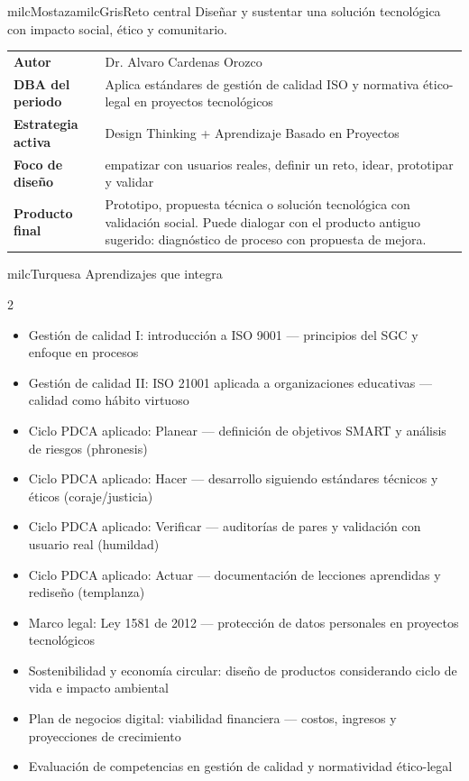 \documentclass[11pt,letterpaper]{article}
\begin{document}
\begin{softbox}{milcMostaza}{milcGris}{Reto central}
Diseñar y sustentar una solución tecnológica con impacto social, ético y comunitario.
\end{softbox}

\begin{tabularx}{\textwidth}{>{\bfseries}p{3.4cm}X}
\rowcolor{milcMagenta!12}Autor & Dr. Alvaro Cardenas Orozco\\
DBA del periodo & Aplica estándares de gestión de calidad ISO y normativa ético-legal en proyectos tecnológicos\\
Estrategia activa & Design Thinking + Aprendizaje Basado en Proyectos\\
Foco de diseño & empatizar con usuarios reales, definir un reto, idear, prototipar y validar\\
Producto final & Prototipo, propuesta técnica o solución tecnológica con validación social. Puede dialogar con el producto antiguo sugerido: diagnóstico de proceso con propuesta de mejora.\\
\end{tabularx}

\begin{titlebox}{milcTurquesa}
Aprendizajes que integra
\end{titlebox}
\begin{multicols}{2}
\begin{itemize}[leftmargin=*]
\item Gestión de calidad I: introducción a ISO 9001 — principios del SGC y enfoque en procesos
\item Gestión de calidad II: ISO 21001 aplicada a organizaciones educativas — calidad como hábito virtuoso
\item Ciclo PDCA aplicado: Planear — definición de objetivos SMART y análisis de riesgos (phronesis)
\item Ciclo PDCA aplicado: Hacer — desarrollo siguiendo estándares técnicos y éticos (coraje/justicia)
\item Ciclo PDCA aplicado: Verificar — auditorías de pares y validación con usuario real (humildad)
\item Ciclo PDCA aplicado: Actuar — documentación de lecciones aprendidas y rediseño (templanza)
\item Marco legal: Ley 1581 de 2012 — protección de datos personales en proyectos tecnológicos
\item Sostenibilidad y economía circular: diseño de productos considerando ciclo de vida e impacto ambiental
\item Plan de negocios digital: viabilidad financiera — costos, ingresos y proyecciones de crecimiento
\item Evaluación de competencias en gestión de calidad y normatividad ético-legal
\end{itemize}
\end{multicols}
\end{document}

